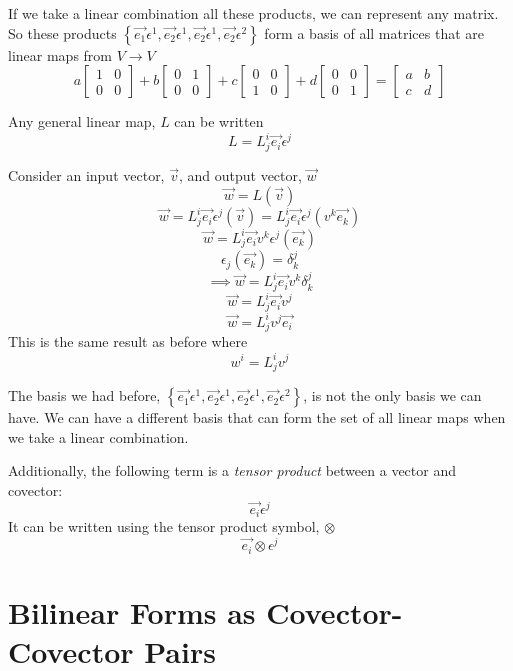 \documentclass{report}
\begin{document}
If we take a linear combination all these products, we can represent any matrix. So these products $\left\{ \vec{e_1}\epsilon^1, \vec{e_2}\epsilon^1, \vec{e_2}\epsilon^1, \vec{e_2}\epsilon^2 \right\}$ form a basis of all matrices that are linear maps from $V \to V$
$$ a \begin{bmatrix} 1 & 0 \\ 0 & 0 \end{bmatrix}  + b \begin{bmatrix} 0 & 1 \\ 0& 0 \end{bmatrix}  + c \begin{bmatrix} 0 & 0 \\ 1 & 0 \end{bmatrix} + d \begin{bmatrix} 0 & 0 \\ 0 & 1 \end{bmatrix} = \begin{bmatrix} a & b \\ c & d \end{bmatrix}   $$ 

Any general linear map, $L$ can be written
 $$ L = L_j^i \vec{e_i} \epsilon^j $$ 

\begin{myproof}
	Consider an input vector, $\vec{v}$, and output vector, $\vec{w}$
	$$ \vec{w } = L\left( \vec{v} \right) $$ 
	$$ \vec{w} = L_j^i \vec{e_i} \epsilon^j\left( \vec{v} \right)=L_j^i \vec{e_i} \epsilon^j\left( v^k \vec{e_k}\right) $$ 
	$$ \vec{w} = L_j^i \vec{e_i}v^k \epsilon^j \left( \vec{e_k} \right) $$ 
	$$ \epsilon_j\left( \vec{e_k} \right) = \delta_k^j $$ 
	$$\implies \vec{w} = L_j^i \vec{e_i} v^k \delta_k^j $$ 
	$$ \vec{w} = L_j^i \vec{e_i}v^j $$ 
	$$ \vec{w} = L_j^i v^j \vec{e_i} $$ 
	This is the same result as before where
	$$ w^i = L_j^i v^j $$ 

\end{myproof}

The basis we had before, $\left\{ \vec{e_1}\epsilon^1, \vec{e_2}\epsilon^1, \vec{e_2}\epsilon^1, \vec{e_2}\epsilon^2 \right\}$, is not the only basis we can have. We can have a different basis that can form the set of all linear maps when we take a linear combination.

Additionally, the following term is a \emph{tensor product} between a vector and covector:
$$ \vec{e_i} \epsilon^j $$ 
It can be written using the tensor product symbol, $\otimes$
$$ \vec{e_i} \otimes \epsilon^j $$ 

\chapter{Bilinear Forms as Covector-Covector Pairs}
\end{document}
